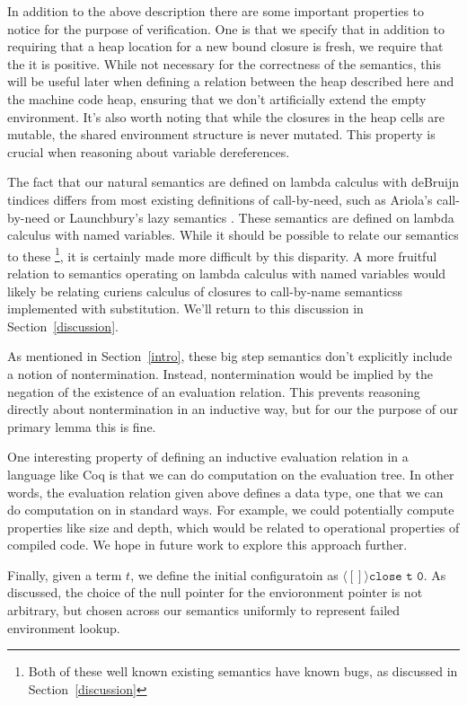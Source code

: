 In addition to the above description there are some important properties to
notice for the purpose of verification. One is that we specify that in addition
to requiring that a heap location for a new bound closure is fresh, we require
that the it is positive. While not necessary for the correctness of the
semantics, this will be useful later when defining a relation between the heap
described here and the machine code heap, ensuring that we don't artificially
extend the empty environment. It's also worth noting that while the closures in
the heap cells are mutable, the shared environment structure is never mutated.
This property is crucial when reasoning about variable dereferences. 

The fact that our natural semantics are defined on lambda calculus with deBruijn
tindices differs from most existing definitions of call-by-need, such as
Ariola's call-by-need \cite{ariola} or Launchbury's lazy semantics
\cite{launchbury}.  These semantics are defined on lambda calculus with named
variables. While it should be possible to relate our semantics to these
\footnote{Both of these well known existing semantics have known bugs, as
discussed in Section~\ref{discussion}}, it is certainly made more difficult by
this disparity. A more fruitful relation to semantics operating on lambda
calculus with named variables would likely be relating curiens calculus of
closures to call-by-name semanticss implemented with substitution. We'll return
to this discussion in Section~\ref{discussion}.

As mentioned in Section~\ref{intro}, these big step semantics don't explicitly
include a notion of nontermination. Instead, nontermination would be implied by
the negation of the existence of an evaluation relation. This prevents reasoning
directly about nontermination in an inductive way, but for our the purpose of
our primary lemma this is fine. 

One interesting property of defining an inductive evaluation relation in a
language like Coq is that we can do computation on the evaluation tree. In other
words, the evaluation relation given above defines a data type, one that we can
do computation on in standard ways. For example, we could potentially compute
properties like size and depth, which would be related to operational properties
of compiled code. We hope in future work to explore this approach further.

Finally, given a term $t$, we define the initial configuratoin as $\langle [] \rangle
\texttt{close t 0}$. As discussed, the choice of the null pointer for the envioronment
pointer is not arbitrary, but chosen across our semantics uniformly to represent
failed environment lookup. 

